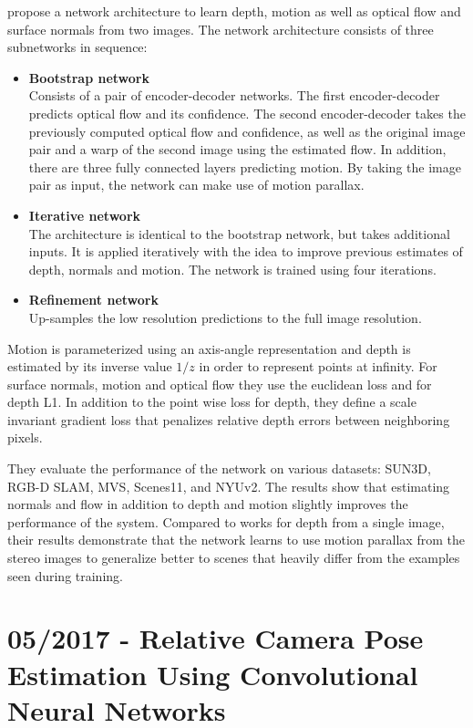 		\cite{ummenhofer2016demon} propose a network architecture to learn depth, motion as well as optical flow and surface normals from two images.
		The network architecture consists of three subnetworks in sequence:
		\begin{itemize}
			\item \textbf{Bootstrap network}
				\\
				Consists of a pair of encoder-decoder networks.
				The first encoder-decoder predicts optical flow and its confidence.
				The second encoder-decoder takes the previously computed optical flow and confidence, as well as the original image pair and a warp of the second image using the estimated flow.
				In addition, there are three fully connected layers predicting motion.
				By taking the image pair as input, the network can make use of motion parallax.
			\item \textbf{Iterative network}
				\\
				The architecture is identical to the bootstrap network, but takes additional inputs.
				It is applied iteratively with the idea to improve previous estimates of depth, normals and motion.
				The network is trained using four iterations.
			\item \textbf{Refinement network}
				\\
				Up-samples the low resolution predictions to the full image resolution.
		\end{itemize}
		Motion is parameterized using an axis-angle representation and depth is estimated by its inverse value $1 / z$ in order to represent points at infinity.
		For surface normals, motion and optical flow they use the euclidean loss and for depth L1.
		In addition to the point wise loss for depth, they define a scale invariant gradient loss that penalizes relative depth errors between neighboring pixels.
		
		They evaluate the performance of the network on various datasets: {SUN3D}, {RGB-D SLAM}, {MVS}, {Scenes11}, and {NYUv2}.
		The results show that estimating normals and flow in addition to depth and motion slightly improves the performance of the system.
		Compared to works for depth from a single image, their results demonstrate that the network learns to use motion parallax from the stereo images to generalize better to scenes that heavily differ from the examples seen during training.
		
	\section{05/2017 - Relative Camera Pose Estimation Using Convolutional Neural Networks}
	
